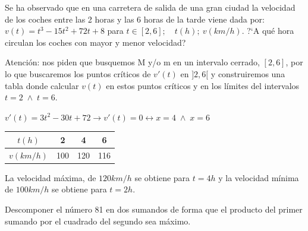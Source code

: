 	
	\begin{ejre} Se ha observado que en una carretera de salida de una gran ciudad la velocidad de los coches entre las 2 horas y las 6 horas de la tarde viene dada por: $v(t)=t^3-15t^2+72t+8$ para $t \in[2,6]; \quad t(h);\ v(km/h)$. ?`A qué hora circulan los coches con mayor y menor velocidad?
		
	\end{ejre}
	
	\begin{proofw}\renewcommand{\qedsymbol}{$\diamond$}
	
	Atención: nos piden que busquemos M y/o m en un intervalo cerrado, $[2,6]$, por lo que buscaremos los puntos críticos de $v'(t)$ en  $]2,6[$ y construiremos una tabla donde calcular $v(t)$ en estos puntos críticos y en los límites del intervalos $t=2\; \wedge \; t=6$.
	
	\begin{multicols}{2}

	$v'(t)=3t^2-30t+72 \to v'(t)= 0 \leftrightarrow x=4 \; \wedge \; x=6 $
	
	\begin{table}[H]
	\centering
	\begin{tabular}{|c|c|c|c|}
	\hline
	 $t(h)$& 2 & 4 & 6 \\ \hline
	$v(km/h)$ & 100 & 120 & 116 \\ \hline
	\end{tabular}
	\end{table}
	
	\end{multicols}
	
	La velocidad máxima, de $120 km/h$ se obtiene para $t=4h$ y la velocidad mínima de $100 km/h$ se obtiene para $t=2h$.
	
	\end{proofw}
	
	
	
	\begin{ejre} Descomponer el número
	81 en dos sumandos de forma que el producto del primer sumando por el cuadrado del segundo sea máximo.
	\end{ejre}
	
